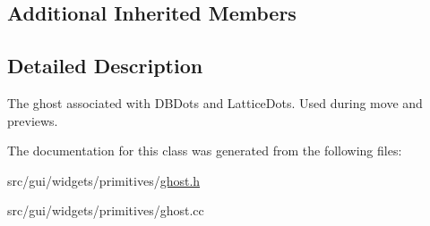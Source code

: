 \subsection*{Additional Inherited Members}


\subsection{Detailed Description}
The ghost associated with D\+B\+Dots and Lattice\+Dots. Used during move and previews. 

The documentation for this class was generated from the following files\+:\begin{DoxyCompactItemize}
\item 
src/gui/widgets/primitives/\hyperlink{ghost_8h}{ghost.\+h}\item 
src/gui/widgets/primitives/ghost.\+cc\end{DoxyCompactItemize}

